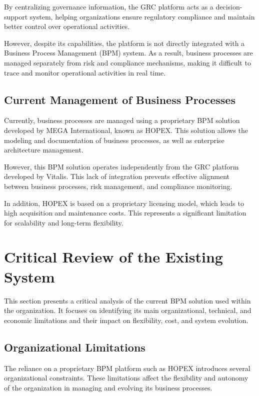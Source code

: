 By centralizing governance information, the GRC platform acts as a decision-support system, helping organizations ensure regulatory compliance and maintain better control over operational activities. 

However, despite its capabilities, the platform is not directly integrated with a Business Process Management (BPM) system. As a result, business processes are managed separately from risk and compliance mechanisms, making it difficult to trace and monitor operational activities in real time.

\subsection{Current Management of Business Processes}

Currently, business processes are managed using a proprietary BPM solution developed by MEGA International, known as HOPEX. This solution allows the modeling and documentation of business processes, as well as enterprise architecture management.

However, this BPM solution operates independently from the GRC platform developed by Vitalis. This lack of integration prevents effective alignment between business processes, risk management, and compliance monitoring.

In addition, HOPEX is based on a proprietary licensing model, which leads to high acquisition and maintenance costs. This represents a significant limitation for scalability and long-term flexibility.

\section{Critical Review of the Existing System}

This section presents a critical analysis of the current BPM solution used within the organization. It focuses on identifying its main organizational, technical, and economic limitations and their impact on flexibility, cost, and system evolution.

\subsection{Organizational Limitations}

The reliance on a proprietary BPM platform such as HOPEX introduces several organizational constraints. These limitations affect the flexibility and autonomy of the organization in managing and evolving its business processes.


